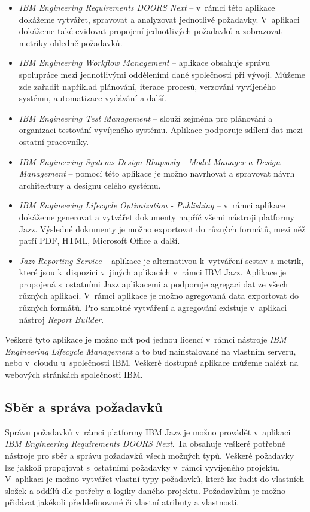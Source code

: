 \documentclass[czech,master]{diploma}
\begin{document}
\begin{itemize}
\item \textit{IBM Engineering Requirements DOORS Next} -- v~rámci této aplikace dokážeme vytvářet, spravovat a analyzovat jednotlivé požadavky. V~aplikaci dokážeme také evidovat propojení jednotlivých požadavků a zobrazovat metriky ohledně požadavků.
\item \textit{IBM Engineering Workflow Management} -- aplikace obsahuje správu spolupráce mezi jednotlivými odděleními dané společnosti při vývoji. Můžeme zde zařadit například plánování, iterace procesů, verzování vyvíjeného systému, automatizace vydávání a další.
\item \textit{IBM Engineering Test Management} -- slouží zejména pro plánování a organizaci testování vyvíjeného systému. Aplikace podporuje sdílení dat mezi ostatní pracovníky.
\item \textit{IBM Engineering Systems Design Rhapsody - Model Manager a Design Management} -- pomocí této aplikace je možno navrhovat a spravovat návrh architektury a designu celého systému.
\item \textit{IBM Engineering Lifecycle Optimization - Publishing} -- v~rámci aplikace dokážeme generovat a vytvářet dokumenty napříč všemi nástroji platformy Jazz. Výsledné dokumenty je možno exportovat do různých formátů, mezi něž patří PDF, HTML, Microsoft Office a další.
\item \textit{Jazz Reporting Service} -- aplikace je alternativou k~vytváření sestav a metrik, které jsou k~dispozici v~jiných aplikacích v~rámci IBM Jazz. Aplikace je propojená s~ostatními Jazz aplikacemi a podporuje agregaci dat ze všech různých aplikací. V~rámci aplikace je možno agregovaná data exportovat do různých formátů. Pro samotné vytváření a agregování existuje v~aplikaci nástroj \textit{Report Builder}.
\end{itemize}

Veškeré tyto aplikace je možno mít pod jednou licencí v~rámci nástroje \textit{IBM Engineering Lifecycle Management} a to buď nainstalované na vlastním serveru, nebo v~cloudu u~společnosti IBM. Veškeré dostupné aplikace můžeme nalézt na webových stránkách společnosti IBM. \cite{ref:jazz_products}

\subsection{Sběr a správa požadavků}
Správu požadavků v~rámci platformy IBM Jazz je možno provádět v~aplikaci \textit{IBM Engineering Requirements DOORS Next}. Ta obsahuje veškeré potřebné nástroje pro sběr a správu požadavků všech možných typů. Veškeré požadavky lze jakkoli propojovat s~ostatními požadavky v~rámci vyvíjeného projektu. V~aplikaci je možno vytvářet vlastní typy požadavků, které lze řadit do vlastních složek a oddílů dle potřeby a logiky daného projektu. Požadavkům je možno přidávat jakékoli předdefinované či vlastní atributy a vlastnosti.
\end{document}
